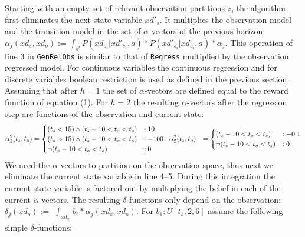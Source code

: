 \documentclass{article} %
\begin{document}
Starting with an empty set of relevant observation partitions $z$, the algorithm first eliminates the next state variable $xd'_s$. It multiplies the observation model and the transition model in the set of $\alpha$-vectors of the previous horizon:
$\alpha_j(xd_s,xd_o) := \int_{s'} P(xd_{o_i}|xd'_{s_i},a) * P(xd'_{s_i}| xd_{s_i},a)* \alpha_j $. 
This operation of line 3 in \texttt{GenRelObs} is similar to that of \texttt{Regress} multiplied by the observation regressed model. For continuous variables the continuous regression and for discrete variables boolean restriction is used as defined in the previous section. 
Assuming that after $h=1$ the set of $\alpha$-vectors are defined equal to the reward function of equation (1).
For $h=2$ the resulting $\alpha$-vectors after the regression step are functions of the observation and current state: 
{\footnotesize
\vspace{-2mm}
\begin{align}
\alpha_1^2(t_s,t_o) &= 
\begin{cases}
 (t_s<15)\wedge (t_s - 10 < t_o<t_s) &: 10 \\
(t_s>15)\wedge (t_s - 10 < t_o<t_s) &: -100  \\
\neg(t_s - 10 < t_o<t_s) &: 0
\end{cases}
\hspace{2mm} 
\alpha_2^2(t_s,t_o) &= \begin{cases}
(t_s - 10 < t_o<t_s) &: -0.1 \\
\neg(t_s - 10 < t_o<t_s) &: 0
\end{cases}
\nonumber
\end{align}
}
We need the $\alpha$-vectors to partition on the observation space, thus next we eliminate the current state variable in line 4--5. During this integration the current state variable is factored out by multiplying the belief in each of the current $\alpha$-vectors.  The resulting $\delta$-functions only depend on the observation: $\delta_{j}(xd_o) := $ $\int_{xd_{s_i}} b_i * \alpha_j(xd_s,xd_o)$.
For $b_1: U[t_s;2,6]$ assume the following simple $\delta$-functions:
\end{document}

